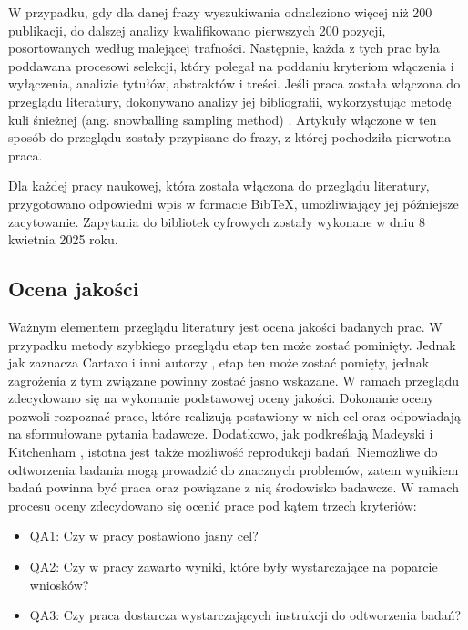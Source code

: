W przypadku, gdy dla danej frazy wyszukiwania odnaleziono więcej niż 200 publikacji, do dalszej analizy kwalifikowano pierwszych 200 pozycji, posortowanych według malejącej trafności.
Następnie, każda z tych prac była poddawana procesowi selekcji, który polegał na poddaniu kryteriom włączenia i wyłączenia, analizie tytułów, abstraktów i treści.
Jeśli praca została włączona do przeglądu literatury, dokonywano analizy jej bibliografii, wykorzystując metodę kuli śnieżnej (ang. snowballing sampling method) \cite{10.1214/aoms/1177705148}.
Artykuły włączone w ten sposób do przeglądu zostały przypisane do frazy, z której pochodziła pierwotna praca.

Dla każdej pracy naukowej, która została włączona do przeglądu literatury, przygotowano odpowiedni wpis w formacie BibTeX, umożliwiający jej późniejsze zacytowanie. 
Zapytania do bibliotek cyfrowych zostały wykonane w dniu 8 kwietnia 2025 roku. 

\subsection{Ocena jakości}\label{chapter:ocena_jakosci}

Ważnym elementem przeglądu literatury jest ocena jakości badanych prac.
W przypadku metody szybkiego przeglądu etap ten może zostać pominięty.
Jednak jak zaznacza Cartaxo i inni autorzy \cite{cartaxo2020rapidreviewssoftwareengineering}, etap ten może zostać pomięty, jednak zagrożenia z tym związane powinny zostać jasno wskazane.
W ramach przeglądu zdecydowano się na wykonanie podstawowej oceny jakości.
Dokonanie oceny pozwoli rozpoznać prace, które realizują postawiony w nich cel oraz odpowiadają na sformułowane pytania badawcze.
Dodatkowo, jak podkreślają Madeyski i Kitchenham \cite{wouldWiderAdoption}, istotna jest także możliwość reprodukcji badań.
Niemożliwe do odtworzenia badania mogą prowadzić do znacznych problemów, zatem wynikiem badań powinna być praca oraz powiązane z nią środowisko badawcze.
W ramach procesu oceny zdecydowano się ocenić prace pod kątem trzech kryteriów:

\begin{itemize}
    \item QA1: Czy w pracy postawiono jasny cel?
    \item QA2: Czy w pracy zawarto wyniki, które były wystarczające na poparcie wniosków?
    \item QA3: Czy praca dostarcza wystarczających instrukcji do odtworzenia badań?
\end{itemize}


